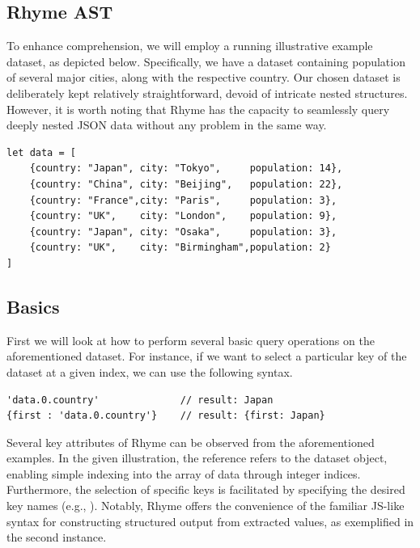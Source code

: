 \documentclass[runningheads]{llncs}
\newcommand{\lang}{Rhyme}
\begin{document}
\subsection{\lang{} AST}\label{subsec:ast}




To enhance comprehension, we will employ a running illustrative example dataset, as
depicted below.
Specifically, we have a dataset containing population of several major cities,
along with the respective country.
Our chosen dataset is deliberately kept relatively straightforward, devoid of
intricate nested structures.
However, it is worth noting that \lang{} has the capacity to seamlessly query
deeply nested JSON data without any problem in the same way.


\begin{lstlisting}[style=JavaScript]
let data = [
    {country: "Japan", city: "Tokyo",     population: 14},
    {country: "China", city: "Beijing",   population: 22},
    {country: "France",city: "Paris",     population: 3},
    {country: "UK",    city: "London",    population: 9},
    {country: "Japan", city: "Osaka",     population: 3},
    {country: "UK",    city: "Birmingham",population: 2}
]
\end{lstlisting}

\subsection{Basics}
First we will look at how to perform several basic query operations on the
aforementioned dataset.
For instance, if we want to select a particular key of the dataset at a given
index, we can use the following syntax.

\begin{lstlisting}[style=JavaScript]
'data.0.country'              // result: Japan
{first : 'data.0.country'}    // result: {first: Japan}
\end{lstlisting}

Several key attributes of \lang{} can be observed from the aforementioned examples.
In the given illustration, the reference  refers to
the dataset object, enabling simple indexing into the array of data through integer
indices.
Furthermore, the selection of specific keys is facilitated by specifying the desired
key names (e.g., ).
Notably, \lang{} offers the convenience of the familiar JS-like syntax for constructing
structured output from extracted values, as exemplified in the second instance.
\end{document}
